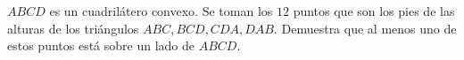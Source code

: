 $ABCD$ es un cuadrilátero convexo. Se toman los $12$ puntos que son los pies de las alturas de los triángulos $ABC, BCD, CDA, DAB$. Demuestra que al menos uno de estos puntos está sobre un lado de $ABCD$.